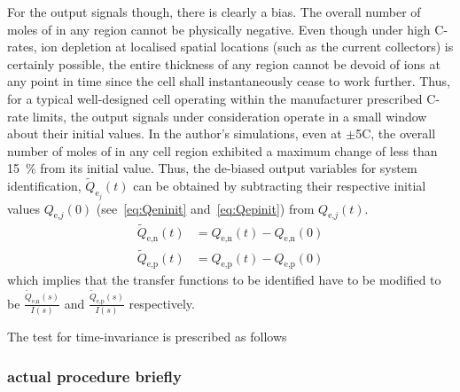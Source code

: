 For the output  signals though, there is  clearly a bias. The  overall number of
moles of   in  any region  cannot be  physically negative.  Even though
under  high C-rates,  ion  depletion  at localised  spatial  locations (such  as
the  current collectors)  is certainly  possible,  the entire  thickness of  any
region  cannot be  devoid of  ions at  any point  in time  since the  cell shall
instantaneously  cease  to  work  further. Thus,  for  a  typical  well-designed
cell  operating within  the manufacturer  prescribed C-rate  limits, the  output
signals  under consideration  operate  in  a small  window  about their  initial
values. In  the author's  simulations, even  at $\pm$5C,  the overall  number of
moles  of   in  any cell  region  exhibited a  maximum  change of  less
than  \SI{15}{\percent}  from its  initial  value.  Thus, the  de-biased  output
variables  for  system  identification, $\widetilde{Q}_{\text{e}_j}(t)$  can  be
obtained  by subtracting  their  respective  initial values  $Q_{\text{e,}j}(0)$
(see~\cref{eq:Qeninit} and~\cref{eq:Qepinit}) from $Q_{\text{e,}j}(t)$.
\begin{align}
    \widetilde{Q}_\text{e,n}(t) &= {Q}_\text{e,n}(t) - {Q}_\text{e,n}(0) \\
    \widetilde{Q}_\text{e,p}(t) &= {Q}_\text{e,p}(t) - {Q}_\text{e,p}(0)
\end{align}
which   implies   that   the   transfer  functions   to   be   identified   have
to   be   modified    to   be   $\frac{\widetilde{Q}_\text{e,n}(s)}{I(s)}$   and
$\frac{\widetilde{Q}_\text{e,p}(s)}{I(s)}$ respectively.

The test for time-invariance is prescribed as follows~\cite{PlettECE5560_02}


\subsubsection*{actual procedure briefly}\label{subsubsec:actualsysid}



